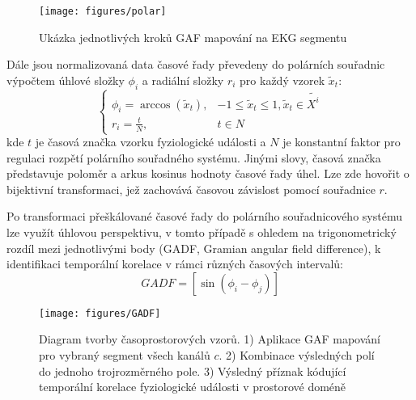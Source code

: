 \begin{figure}[!htb]
    \begin{center}
        \texttt{[image: figures/polar]}
        \caption{Ukázka jednotlivých kroků \gls{GAF} mapování na EKG segmentu}
        \label{fig:polar}
    \end{center}
\end{figure}

Dále jsou normalizovaná data časové řady převedeny do polárních souřadnic
výpočtem úhlové složky $\phi_i$ a radiální složky $r_i$ pro každý vzorek
$\tilde{x}_t$:
\begin{equation}
    \begin{cases}
        \phi_i = \arccos(\tilde{x}_t), & -1 \leq \tilde{x}_t \leq 1, \tilde{x}_t \in \tilde{X^i} \\
        r_i = \frac{t}{N},               & t \in N
    \end{cases}
\end{equation}
kde $t$ je časová značka vzorku fyziologické události a $N$ je konstantní faktor
pro regulaci rozpětí polárního souřadného systému. Jinými slovy, časová značka
představuje poloměr a arkus kosinus hodnoty časové řady úhel. Lze zde hovořit o
bijektivní transformaci, jež zachovává časovou závislost pomocí souřadnice $r$.

Po transformaci přeškálované časové řady do polárního souřadnicového systému lze
využít úhlovou perspektivu, v tomto případě s ohledem na trigonometrický rozdíl
mezi jednotlivými body (\gls{GADF}, Gramian angular field difference), k
identifikaci temporální korelace v rámci různých časových intervalů:
\begin{equation}
    GADF = \left[\sin \left(\phi_i-\phi_j\right)\right]
\end{equation}

\begin{figure}[!htb]
    \begin{center}
        \texttt{[image: figures/GADF]}
        \caption{Diagram tvorby časoprostorových vzorů. 1) Aplikace GAF mapování
            pro vybraný segment všech kanálů $c$. 2) Kombinace výsledných polí
            do jednoho trojrozměrného pole. 3) Výsledný příznak kódující
            temporální korelace fyziologické události v prostorové doméně}
        \label{fig:gadf}
    \end{center}
\end{figure}

